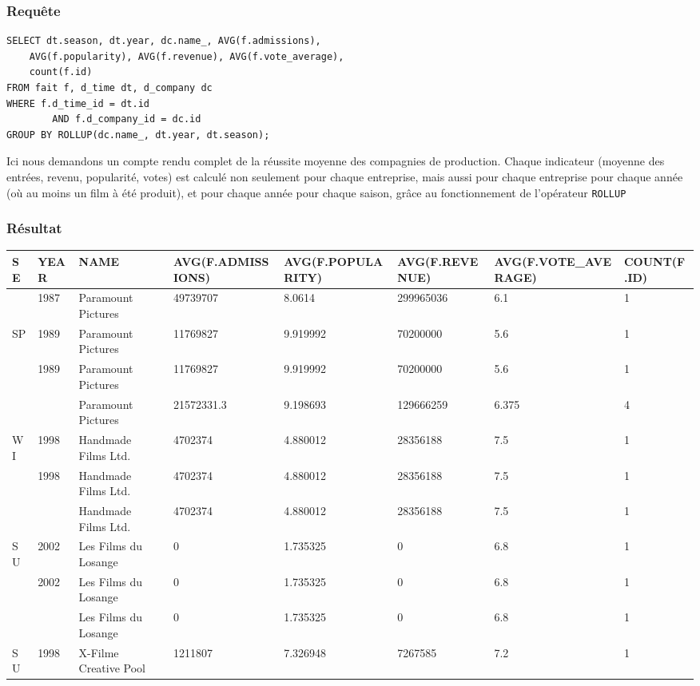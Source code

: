 \subsubsection{Requête}
\begin{lstlisting}
SELECT dt.season, dt.year, dc.name_, AVG(f.admissions),
	AVG(f.popularity), AVG(f.revenue), AVG(f.vote_average),
	count(f.id)
FROM fait f, d_time dt, d_company dc
WHERE f.d_time_id = dt.id
		AND f.d_company_id = dc.id
GROUP BY ROLLUP(dc.name_, dt.year, dt.season);
\end{lstlisting}
Ici nous demandons un compte rendu complet de la réussite moyenne des compagnies de production. Chaque indicateur (moyenne des entrées, revenu, popularité, votes) est calculé non seulement pour chaque entreprise, mais aussi pour chaque entreprise pour chaque année (où au moins un film à été produit), et pour chaque année pour chaque saison, grâce au fonctionnement de l'opérateur \texttt{ROLLUP}
\subsubsection{Résultat}
\begin{table}[H]
	\centering
	\begin{tabular}{l l l l l l l l}
		SE  &  YEAR  &  NAME  &  AVG(F.ADMISSIONS)  &  AVG(F.POPULARITY)  &  AVG(F.REVENUE)  &  AVG(F.VOTE\_AVERAGE)  &  COUNT(F.ID)\\
		\hline
    &  1987  &  Paramount Pictures		 &  49739707		 &  8.0614	 &  299965036	 &  6.1 	 &  1 \\
SP  & 1989  &  Paramount Pictures		 &  11769827		 &  9.919992	 &  70200000	 &  5.6 	 &  1 \\
    & 1989  &  Paramount Pictures		 &  11769827		 &  9.919992	 &  70200000	 &  5.6 	 &  1 \\
    &       &  Paramount Pictures		 &  21572331.3	 &  9.198693	 &  129666259	 &  6.375  &  4 \\
WI  & 1998  &  Handmade Films Ltd.		 &  4702374		 &  4.880012	 &  28356188	 &  7.5 	 &  1 \\
    & 1998  &  Handmade Films Ltd.		 &  4702374		 &  4.880012	 &  28356188	 &  7.5 	 &  1 \\
    &       &  Handmade Films Ltd.		 &  4702374		 &  4.880012	 &  28356188	 &  7.5 	 &  1 \\
SU  & 2002  &  Les Films du Losange		 &  0				 &  1.735325	 &  0			 &  6.8 	 &  1 \\
    & 2002  &  Les Films du Losange		 &  0				 &  1.735325	 &  0			 &  6.8 	 &  1 \\
    &       &  Les Films du Losange		 &  0				 &  1.735325	 &  0			 &  6.8 	 &  1 \\
SU  & 1998  &  X-Filme Creative Pool	 & 1211807		 &  7.326948	 &  7267585	 &  7.2 	 &  1 \\
	\end{tabular}
\end{table}


